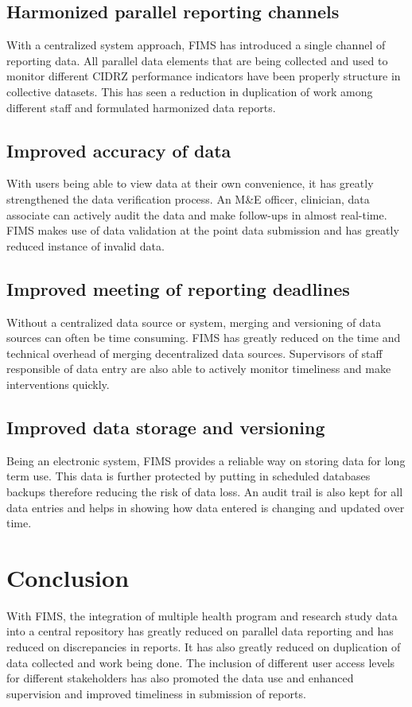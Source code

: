 \documentclass[conference]{IEEEtran}
\begin{document}
\subsection{Harmonized parallel reporting channels}
With a centralized system approach, FIMS has introduced a single channel of reporting data. All parallel data elements that are being collected and used to monitor different CIDRZ performance indicators have been properly structure in collective datasets.
This has seen a reduction in duplication of work among different staff and formulated harmonized data reports.

\subsection{Improved accuracy of data}
With users being able to view data at their own convenience, it has greatly strengthened the data verification process. An M\&E officer, clinician, data associate can actively audit the data and make follow-ups in almost real-time. FIMS makes use of data validation at the point data submission
and has greatly reduced instance of invalid data.

\subsection{Improved meeting of reporting deadlines}
Without a centralized data source or system, merging and versioning of data sources can often be time consuming. FIMS has greatly reduced on the time and technical overhead of merging decentralized data sources. Supervisors of staff responsible of data entry are also able to actively monitor timeliness
and make interventions quickly.

\subsection{Improved data storage and versioning}
Being an electronic system, FIMS provides a reliable way on storing data for long term use. This data is further protected by putting in scheduled databases backups therefore reducing the risk of data loss. An audit trail is also kept for all data entries and helps in showing
how data entered is changing and updated over time.

\section{Conclusion}
With FIMS, the integration of multiple health program and research study data into a central repository has greatly reduced on parallel data reporting and has reduced on discrepancies in reports.
It has also greatly reduced on duplication of data collected and work being done. The inclusion of different user access levels for different stakeholders has also promoted the data use and enhanced supervision and improved timeliness in submission of reports.
\end{document}
